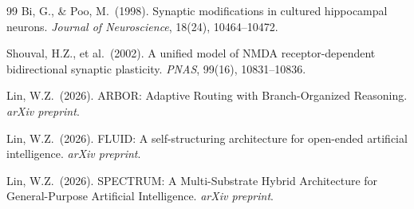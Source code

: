 \documentclass[12pt]{article}
\begin{document}
\begin{thebibliography}{99}
 Bi, G., \& Poo, M.\ (1998). Synaptic modifications in cultured hippocampal neurons. \textit{Journal of Neuroscience}, 18(24), 10464--10472.

 Shouval, H.Z., et al.\ (2002). A unified model of NMDA receptor-dependent bidirectional synaptic plasticity. \textit{PNAS}, 99(16), 10831--10836.

 Lin, W.Z.\ (2026). ARBOR: Adaptive Routing with Branch-Organized Reasoning. \textit{arXiv preprint}.

 Lin, W.Z.\ (2026). FLUID: A self-structuring architecture for open-ended artificial intelligence. \textit{arXiv preprint}.

 Lin, W.Z.\ (2026). SPECTRUM: A Multi-Substrate Hybrid Architecture for General-Purpose Artificial Intelligence. \textit{arXiv preprint}.

\end{thebibliography}
\end{document}
